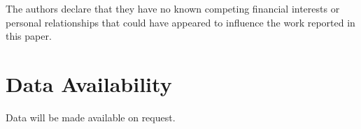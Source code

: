 \documentclass[journal]{IEEEtran}
\begin{document}
The authors declare that they have no known competing financial interests or personal relationships that could have appeared to influence the work reported in this paper.

\section*{Data Availability}

Data will be made available on request.

\FloatBarrier



\end{document}
